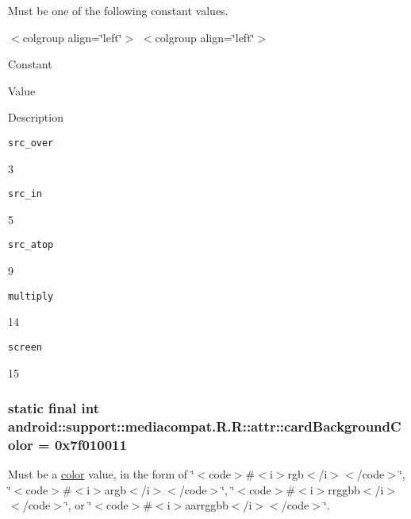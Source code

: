 Must be one of the following constant values. \begin{TabularC}{0}
\hline
\end{TabularC}
$<$colgroup align=\char`\"{}left\char`\"{}$>$ $<$colgroup align=\char`\"{}left\char`\"{}$>$ 

Constant

Value

Description 

{\tt src\_\-over}

3

{\tt src\_\-in}

5

{\tt src\_\-atop}

9

{\tt multiply}

14

{\tt screen}

15\hypertarget{classandroid_1_1support_1_1mediacompat_1_1_r_1_1attr_3610a1b0614212bb6bbefe5c874bc153}{
\subsubsection[{cardBackgroundColor}]{\setlength{\rightskip}{0pt plus 5cm}static final int android::support::mediacompat.R.R::attr::cardBackgroundColor = 0x7f010011}}
\label{classandroid_1_1support_1_1mediacompat_1_1_r_1_1attr_3610a1b0614212bb6bbefe5c874bc153}


Must be a \hyperlink{classandroid_1_1support_1_1mediacompat_1_1_r_1_1color}{color} value, in the form of \char`\"{}$<$code$>$\#$<$i$>$rgb$<$/i$>$$<$/code$>$\char`\"{}, \char`\"{}$<$code$>$\#$<$i$>$argb$<$/i$>$$<$/code$>$\char`\"{}, \char`\"{}$<$code$>$\#$<$i$>$rrggbb$<$/i$>$$<$/code$>$\char`\"{}, or \char`\"{}$<$code$>$\#$<$i$>$aarrggbb$<$/i$>$$<$/code$>$\char`\"{}. 

